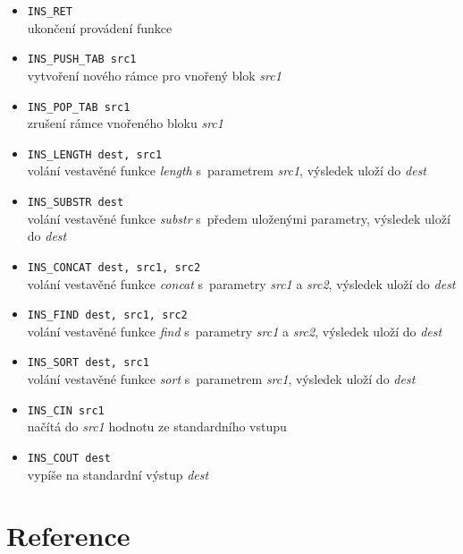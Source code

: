 \documentclass[a4paper, 12pt]{article}
\begin{document}
\begin{itemize}
	\item{\texttt{INS\_RET}} \\
	ukončení provádení funkce
	
	\item{\texttt{INS\_PUSH\_TAB src1}} \\
	vytvoření nového rámce pro vnořený blok \textit{src1}
	
	\item{\texttt{INS\_POP\_TAB src1}} \\
	zrušení rámce vnořeného bloku \textit{src1}
	
	\item{\texttt{INS\_LENGTH dest, src1}} \\
	volání vestavěné funkce \textit{length} s~parametrem \textit{src1}, výsledek uloží do \textit{dest}	
	
	\item{\texttt{INS\_SUBSTR dest}} \\
	volání vestavěné funkce \textit{substr} s~předem uloženými parametry, výsledek uloží do \textit{dest}
	
	\item{\texttt{INS\_CONCAT dest, src1, src2}} \\
	volání vestavěné funkce \textit{concat} s~parametry \textit{src1} a \textit{src2}, výsledek uloží do \textit{dest}
	
	\item{\texttt{INS\_FIND dest, src1, src2}} \\
	volání vestavěné funkce \textit{find} s~parametry \textit{src1} a \textit{src2}, výsledek uloží do \textit{dest}
	
	\item{\texttt{INS\_SORT dest, src1}} \\
	volání vestavěné funkce \textit{sort} s~parametrem \textit{src1}, výsledek uloží do \textit{dest}
	
	\item{\texttt{INS\_CIN src1}} \\
	načítá do \textit{src1} hodnotu ze standardního vstupu
	
	\item{\texttt{INS\_COUT dest}} \\
	vypíše na standardní výstup \textit{dest}
\end{itemize}

\section{Reference} \label{reference}
\end{document}
